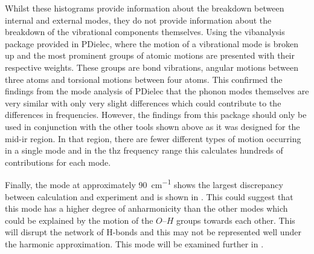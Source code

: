 Whilst these histograms provide information about the breakdown between internal and external modes, they do not provide information about the breakdown of the vibrational components themselves. Using the vibanalysis \cite{Teixeira2018VMARD} package provided in PDielec, where the motion of a vibrational mode is broken up and the most prominent groups of atomic motions are presented with their respective weights. These groups are bond vibrations, angular motions between three atoms and torsional motions between four atoms. This confirmed the findings from the mode analysis of PDielec that the phonon modes themselves are very similar with only very slight differences which could contribute to the differences in frequencies. However, the findings from this package should only be used in conjunction with the other tools shown above as it was designed for the mid\nobreakdash-\acrshort{ir} region. In that region, there are fewer different types of motion occurring in a single mode and in the \acrshort{thz} frequency range this calculates hundreds of contributions for each mode. 

Finally, the mode at approximately \SI{90}{cm^{-1}} shows the largest discrepancy between calculation and experiment and is shown in . This could suggest that this mode has a higher degree of anharmonicity than the other modes which could be explained by the motion of the \(O\)\nobreakdash--\(H\) groups towards each other. This will disrupt the network of H\nobreakdash-bonds and this may not be represented well under the harmonic approximation. This mode will be examined further in .

